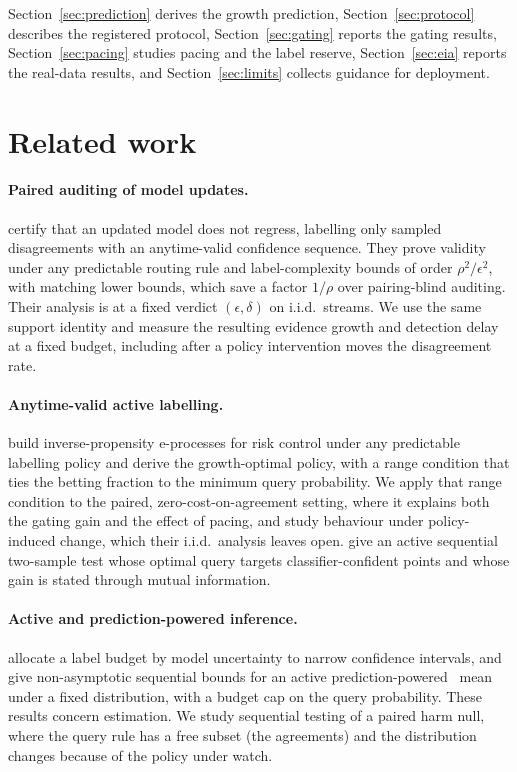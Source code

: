 Section~\ref{sec:prediction} derives the growth prediction, Section~\ref{sec:protocol} describes the registered protocol, Section~\ref{sec:gating} reports the gating results,
Section~\ref{sec:pacing} studies pacing and the label reserve, Section~\ref{sec:eia} reports the real-data results, and Section~\ref{sec:limits} collects guidance for deployment.

\section{Related work}\label{sec:related}

\paragraph{Paired auditing of model updates.}
\citet{discern} certify that an updated model does not regress, labelling only sampled disagreements with an anytime-valid confidence sequence.
They prove validity under any predictable routing rule and label-complexity bounds of order $\rho^2/\epsilon^2$, with matching lower bounds, which save a factor $1/\rho$ over pairing-blind auditing.
Their analysis is at a fixed verdict $(\epsilon,\delta)$ on i.i.d.\ streams. We use the same support identity and measure the resulting evidence growth and detection delay at a fixed budget,
including after a policy intervention moves the disagreement rate.

\paragraph{Anytime-valid active labelling.}
\citet{xu2024active} build inverse-propensity e-processes for risk control under any predictable labelling policy and derive the growth-optimal policy,
with a range condition that ties the betting fraction to the minimum query probability. We apply that range condition to the paired, zero-cost-on-agreement setting,
where it explains both the gating gain and the effect of pacing, and study behaviour under policy-induced change, which their i.i.d.\ analysis leaves open.
\citet{active2sample} give an active sequential two-sample test whose optimal query targets classifier-confident points and whose gain is stated through mutual information.

\paragraph{Active and prediction-powered inference.}
\citet{zrnic2024active} allocate a label budget by model uncertainty to narrow confidence intervals, and \citet{sfyraki2026} give non-asymptotic sequential bounds
for an active prediction-powered~\citep{angelopoulos2023ppi} mean under a fixed distribution, with a budget cap on the query probability. These results concern estimation. We study sequential testing
of a paired harm null, where the query rule has a free subset (the agreements) and the distribution changes because of the policy under watch.

